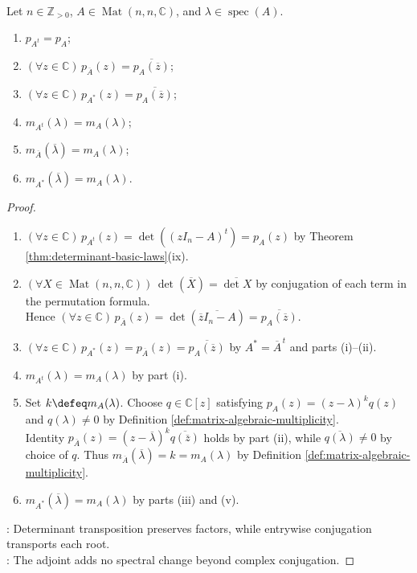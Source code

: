 \begin{proposition} \label{prop:transpose-conjugate-adjoint-characteristic-polynomial} \\
Let $n\in\mathbb{Z}_{>0}$, $A\in\operatorname{Mat}(n,n,\mathbb{C})$, and $\lambda\in\operatorname{spec}(A)$.
\begin{enumerate}[label=(\roman*)]
\setlength{\itemsep}{0pt}
\item $p_{A^t}=p_A$;
\item $(\forall z\in\mathbb{C})\,p_{\overline{A}}(z)=\overline{p_A(\overline{z})}$;
\item $(\forall z\in\mathbb{C})\,p_{A^*}(z)=\overline{p_A(\overline{z})}$;
\item $m_{A^t}(\lambda)=m_A(\lambda)$;
\item $m_{\overline{A}}(\overline{\lambda})=m_A(\lambda)$;
\item $m_{A^*}(\overline{\lambda})=m_A(\lambda)$.
\end{enumerate}
\begin{proof}
\begin{enumerate}[label=(\roman*)]
\setlength{\itemsep}{0pt}
\item $(\forall z\in\mathbb{C})\,p_{A^t}(z)=\det((zI_n-A)^t)=p_A(z)$ by Theorem \ref{thm:determinant-basic-laws}(ix).
\item $(\forall X\in\operatorname{Mat}(n,n,\mathbb{C}))\,\det(\overline{X})=\overline{\det X}$ by conjugation of each term in the permutation formula.\\
Hence $(\forall z\in\mathbb{C})\,p_{\overline{A}}(z)=\det(\overline{\overline{z}I_n-A})=\overline{p_A(\overline{z})}$.
\item $(\forall z\in\mathbb{C})\,p_{A^*}(z)=p_{\overline{A}}(z)=\overline{p_A(\overline{z})}$ by $A^*=\overline{A}^{\,t}$ and parts (i)--(ii).
\item $m_{A^t}(\lambda)=m_A(\lambda)$ by part (i).
\item Set $k\defeq m_A(\lambda)$. Choose $q\in\mathbb{C}[z]$ satisfying $p_A(z)=(z-\lambda)^kq(z)$ and $q(\lambda)\neq0$ by Definition \ref{def:matrix-algebraic-multiplicity}.\\
Identity $p_{\overline{A}}(z)=(z-\overline{\lambda})^k\overline{q(\overline{z})}$ holds by part (ii), while $\overline{q(\lambda)}\neq0$ by choice of $q$. Thus $m_{\overline{A}}(\overline{\lambda})=k=m_A(\lambda)$ by Definition \ref{def:matrix-algebraic-multiplicity}.
\item $m_{A^*}(\overline{\lambda})=m_A(\lambda)$ by parts (iii) and (v).
\end{enumerate}
: Determinant transposition preserves factors, while entrywise conjugation transports each root.\\
: The adjoint adds no spectral change beyond complex conjugation.
\end{proof}
\end{proposition}

